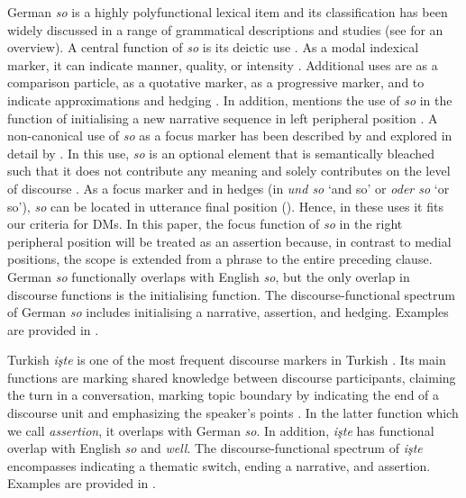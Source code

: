 \documentclass[output=paper,colorlinks,citecolor=brown]{langscibook}
\begin{document}
German \textit{so} is a highly polyfunctional lexical item and its classification has been widely discussed in a range of grammatical descriptions and studies (see \citealt{schumann_fokusmarker_2021} for an overview). A central function of \textit{so} is its deictic use \citep[e.g][]{thurmair_vergleiche_2001,ehlich_so_2007}.
As a modal indexical marker, it can indicate manner, quality, or intensity \citep{wiese_so_2011, schumann_fokusmarker_2021}. Additional uses are as a comparison particle, as a quotative marker, as a progressive marker, and to indicate approximations and hedging \citep[cf.][]{hennig_grammatik_2006, wiese_so_2011, wiese_kiezdeutsch_2012, schumann_fokusmarker_2021}. In addition, \citet{hennig_grammatik_2006} mentions the use of \textit{so} in the function of initialising a new narrative sequence in left peripheral position \citep[cf.][]{hennig_grammatik_2006}. A non-canonical use of \textit{so} as a focus marker has been described by \citet{wiese_so_2011} and explored in detail by \citet{schumann_fokusmarker_2021}. In this use, \textit{so} is an optional element that is semantically bleached such that it does not contribute any meaning and solely contributes on the level of discourse \citep{wiese_so_2011}. As a focus marker and in hedges (in \textit{und so} ‘and so’ or \textit{oder so} ‘or so’), \textit{so} can be located in utterance final position (\cites{wiese_kiezdeutsch_2012}[48]{schumann_fokusmarker_2021}). Hence, in these uses it fits our criteria for DMs. In this paper, the focus function of \textit{so} in the right peripheral position will be treated as an assertion because, in contrast to medial positions, the scope is extended from a phrase to the entire preceding clause. German \textit{so} functionally overlaps with English \textit{so}, but the only overlap in discourse functions is the initialising function. The discourse-functional spectrum of German \textit{so} includes initialising a narrative, assertion, and hedging. Examples are provided in .

Turkish \textit{işte} is one of the most frequent discourse markers in Turkish \citep{yilmaz_pragmatic_2004}. Its main functions are marking shared knowledge between discourse participants, claiming the turn in a conversation, marking topic boundary by indicating the end of a discourse unit and emphasizing the speaker’s points \citep{ozbek_yani_2000, yilmaz_pragmatic_2004}. In the latter function which we call \textit{assertion}, it overlaps with German \textit{so}. In addition, \textit{işte} has functional overlap with English \textit{so} and \textit{well}. The discourse-functional spectrum of \textit{işte} encompasses indicating a thematic switch, ending a narrative, and assertion. Examples are provided in .
\end{document}
